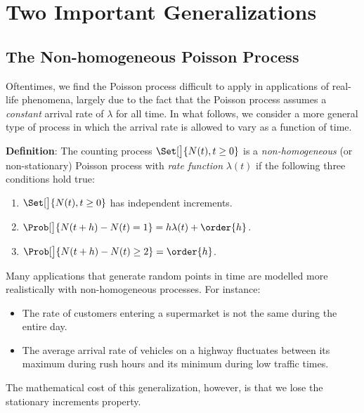 \section{Two Important Generalizations}
\subsection*{The Non-homogeneous Poisson Process}
Oftentimes, we find the Poisson process difficult to apply in applications of real-life
phenomena, largely due to the fact that the Poisson process assumes a \emph{constant} arrival rate of
$ \lambda $ for all time. In what follows, we consider a more general type of process in which the arrival
rate is allowed to vary as a function of time.
\begin{Regular}
    \textbf{Definition}: The counting process $ \Set[\big]{N(t),t\ge 0} $ is a \emph{non-homogeneous} (or non-stationary)
    Poisson process with \emph{rate function} $ \lambda(t) $ if the following three conditions hold true:
    \begin{enumerate}[(1)]
        \item $ \Set[\big]{N(t),t\ge 0} $ has independent increments.
        \item $ \Prob[\big]{N(t+h)-N(t)=1}=h\lambda(t)+\order{h} $.
        \item $ \Prob[\big]{N(t+h)-N(t)\ge 2}=\order{h} $.
    \end{enumerate}
\end{Regular}
Many applications that generate random points in time are modelled more realistically with
non-homogeneous processes. For instance:
\begin{itemize}
    \item The rate of customers entering a supermarket is not the same during the entire day.
    \item The average arrival rate of vehicles on a highway fluctuates between its maximum during
          rush hours and its minimum during low traffic times.
\end{itemize}
The mathematical cost of this generalization, however, is that we lose the stationary
increments property.

